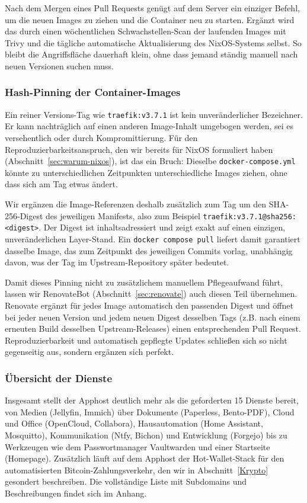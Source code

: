 Nach dem Mergen eines Pull Requests genügt auf dem Server ein einziger Befehl,
um die neuen Images zu ziehen und die Container neu zu starten. Ergänzt wird das
durch einen wöchentlichen Schwachstellen-Scan der laufenden Images mit Trivy
und die tägliche automatische Aktualisierung des NixOS-Systems selbst. So
bleibt die Angriffsfläche dauerhaft klein, ohne dass jemand ständig manuell
nach neuen Versionen suchen muss.


\subsubsection{Hash-Pinning der Container-Images}
\label{sec:apphost-digest-pinning}

Ein reiner Versions-Tag wie \texttt{traefik:v3.7.1} ist kein
unveränderlicher Bezeichner. Er kann nachträglich auf einen anderen Image-Inhalt umgebogen werden, sei es versehentlich oder
durch Kompromittierung. Für den Reproduzierbarkeitsanspruch, den
wir bereits für NixOS formuliert haben (Abschnitt~\ref{sec:warum-nixos}), ist
das ein Bruch: Dieselbe \texttt{docker-compose.yml} könnte zu unterschiedlichen Zeitpunkten unterschiedliche Images ziehen, ohne dass sich am Tag etwas ändert.

Wir ergänzen die Image-Referenzen deshalb zusätzlich zum Tag um den
SHA-256-Digest des jeweiligen Manifests, also zum Beispiel
\texttt{traefik:v3.7.1@sha256:<digest>}. Der Digest ist inhaltsadressiert und
zeigt exakt auf einen einzigen, unveränderlichen Layer-Stand. Ein
\texttt{docker compose pull} liefert damit garantiert dasselbe Image, das zum
Zeitpunkt des jeweiligen Commits vorlag, unabhängig davon, was der Tag im
Upstream-Repository später bedeutet.

Damit dieses Pinning nicht zu zusätzlichem manuellem Pflegeaufwand führt, lassen
wir RenovateBot (Abschnitt~\ref{sec:renovate}) auch diesen Teil übernehmen.
Renovate ergänzt für jedes Image automatisch den passenden Digest und öffnet bei jeder
neuen Version und jedem neuen Digest desselben Tags (z.B. nach einem
erneuten Build desselben Upstream-Releases) einen entsprechenden Pull Request.
Reproduzierbarkeit und automatisch gepflegte Updates schließen sich so nicht
gegenseitig aus, sondern ergänzen sich perfekt.


\subsubsection{Übersicht der Dienste}

Insgesamt stellt der Apphost deutlich mehr als die geforderten 15 Dienste
bereit, von Medien (Jellyfin, Immich) über Dokumente (Paperless, Bento-\ac{PDF}),
Cloud und Office (OpenCloud, Collabora), Hausautomation (Home Assistant,
Mosquitto), Kommunikation (Ntfy, Bichon) und Entwicklung (Forgejo) bis zu
Werkzeugen wie dem Passwortmanager Vaultwarden und einer Startseite (Homepage).
Zusätzlich läuft auf dem Apphost der Hot-Wallet-Stack für den automatisierten
Bitcoin-Zahlungsverkehr, den wir in Abschnitt~\ref{Krypto} gesondert
beschreiben.
Die vollständige Liste mit Subdomains und Beschreibungen findet sich im Anhang.


